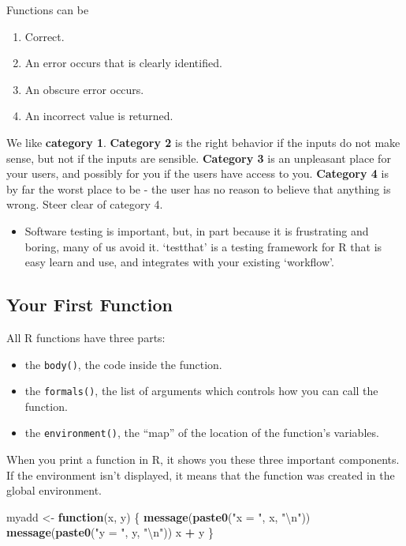 \documentclass[]{book}
\newenvironment{Shaded}{\begin{snugshade}}{\end{snugshade}}
\newcommand{\KeywordTok}[1]{\textcolor[rgb]{0.13,0.29,0.53}{\textbf{#1}}}
\newcommand{\CharTok}[1]{\textcolor[rgb]{0.31,0.60,0.02}{#1}}
\newcommand{\StringTok}[1]{\textcolor[rgb]{0.31,0.60,0.02}{#1}}
\newcommand{\ControlFlowTok}[1]{\textcolor[rgb]{0.13,0.29,0.53}{\textbf{#1}}}
\newcommand{\OperatorTok}[1]{\textcolor[rgb]{0.81,0.36,0.00}{\textbf{#1}}}
\newcommand{\NormalTok}[1]{#1}
\providecommand{\tightlist}{%
  \setlength{\itemsep}{0pt}\setlength{\parskip}{0pt}}
\newenvironment{rmdblock}[1]
  {\begin{shaded*}
  \begin{itemize}
  \renewcommand{\labelitemi}{
    \raisebox{-.7\height}[0pt][0pt]{
      {\setkeys{Gin}{width=3em,keepaspectratio}\texttt{[image: images/\#1]}}
    }
  }
  \item
  }
  {
  \end{itemize}
  \end{shaded*}
  }
\newenvironment{rmdimportant}
  {\begin{rmdblock}{important}}
  {\end{rmdblock}}
\begin{document}
Functions can be

\begin{enumerate}
\def\labelenumi{\arabic{enumi}.}
\tightlist
\item
  Correct.
\item
  An error occurs that is clearly identified.
\item
  An obscure error occurs.
\item
  An incorrect value is returned.
\end{enumerate}

We like \textbf{category 1}. \textbf{Category 2} is the right behavior
if the inputs do not make sense, but not if the inputs are sensible.
\textbf{Category 3} is an unpleasant place for your users, and possibly
for you if the users have access to you. \textbf{Category 4} is by far
the worst place to be - the user has no reason to believe that anything
is wrong. Steer clear of category 4.

\begin{rmdimportant}
Software testing is important, but, in part because it is frustrating
and boring, many of us avoid it. `testthat' is a testing framework for R
that is easy learn and use, and integrates with your existing
`workflow'.
\end{rmdimportant}

\subsection{Your First Function}\label{your-first-function}

All R functions have three parts:

\begin{itemize}
\item
  the \texttt{body()}, the code inside the function.
\item
  the \texttt{formals()}, the list of arguments which controls how you
  can call the function.
\item
  the \texttt{environment()}, the ``map'' of the location of the
  function's variables.
\end{itemize}

When you print a function in R, it shows you these three important
components. If the environment isn't displayed, it means that the
function was created in the global environment.

\begin{Shaded}
\begin{Highlighting}[]
\NormalTok{myadd <-}\StringTok{ }\ControlFlowTok{function}\NormalTok{(x, y) \{}
  \KeywordTok{message}\NormalTok{(}\KeywordTok{paste0}\NormalTok{(}\StringTok{"x = "}\NormalTok{, x, }\StringTok{"}\CharTok{\textbackslash{}n}\StringTok{"}\NormalTok{))}
  \KeywordTok{message}\NormalTok{(}\KeywordTok{paste0}\NormalTok{(}\StringTok{"y = "}\NormalTok{, y, }\StringTok{"}\CharTok{\textbackslash{}n}\StringTok{"}\NormalTok{))}
\NormalTok{  x }\OperatorTok{+}\StringTok{ }\NormalTok{y}
\NormalTok{\}}
\end{Highlighting}
\end{Shaded}
\end{document}
